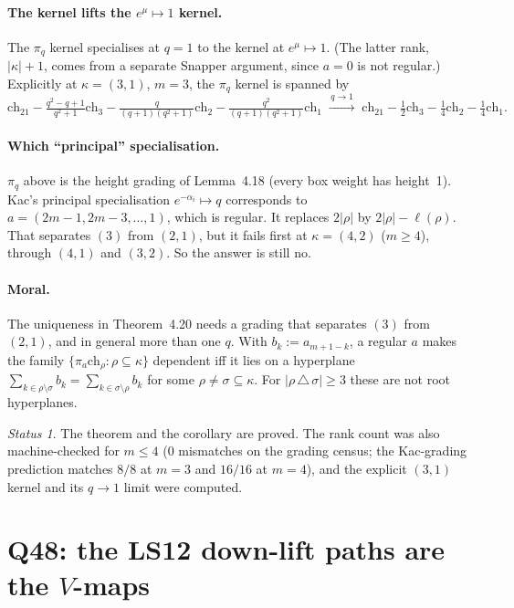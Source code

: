 \documentclass[11pt]{article}
\theoremstyle{plain}
\theoremstyle{remark}
\newtheorem*{status}{Status}
\newcommand{\ch}{\mathrm{ch}}
\begin{document}
\paragraph{The kernel lifts the $e^\mu\mapsto1$ kernel.} The $\pi_q$ kernel specialises at $q=1$ to
the kernel at $e^\mu\mapsto 1$. (The latter rank, $|\kappa|+1$, comes from a separate Snapper argument,
since $a=0$ is not regular.) Explicitly at $\kappa=(3,1)$, $m=3$, the $\pi_q$ kernel is spanned by
\[
\ch_{21}-\tfrac{q^2-q+1}{q^2+1}\ch_3-\tfrac{q}{(q+1)(q^2+1)}\ch_2-\tfrac{q^2}{(q+1)(q^2+1)}\ch_1
\;\xrightarrow{\,q\to1\,}\;\ch_{21}-\tfrac12\ch_3-\tfrac14\ch_2-\tfrac14\ch_1 .
\]

\paragraph{Which ``principal'' specialisation.} $\pi_q$ above is the height grading of Lemma~4.18 (every
box weight has height~1). Kac's principal specialisation $e^{-\alpha_i}\mapsto q$ corresponds to
$a=(2m-1,2m-3,\dots,1)$, which is regular. It replaces $2|\rho|$ by $2|\rho|-\ell(\rho)$. That
separates $(3)$ from $(2,1)$, but it fails first at $\kappa=(4,2)$ ($m\ge4$), through $(4,1)$ and
$(3,2)$. So the answer is still no.

\paragraph{Moral.} The uniqueness in Theorem~4.20 needs a grading that separates $(3)$ from $(2,1)$,
and in general more than one $q$. With $b_k:=a_{m+1-k}$, a regular $a$ makes the family
$\{\pi_a\ch_\rho:\rho\subseteq\kappa\}$ dependent iff it lies on a hyperplane
$\sum_{k\in\rho\setminus\sigma}b_k=\sum_{k\in\sigma\setminus\rho}b_k$ for some $\rho\neq\sigma\subseteq\kappa$.
For $|\rho\,\triangle\,\sigma|\ge3$ these are not root hyperplanes.

\begin{status}
The theorem and the corollary are proved. The rank count was also machine-checked for $m\le4$
($0$ mismatches on the grading census; the Kac-grading prediction matches $8/8$ at $m=3$ and $16/16$
at $m=4$), and the explicit $(3,1)$ kernel and its $q\to1$ limit were computed.
\end{status}

\section{\texorpdfstring{Q48: the LS12 down-lift paths are the $V$-maps}{Q48: the LS12 down-lift paths are the V-maps}}
\end{document}
